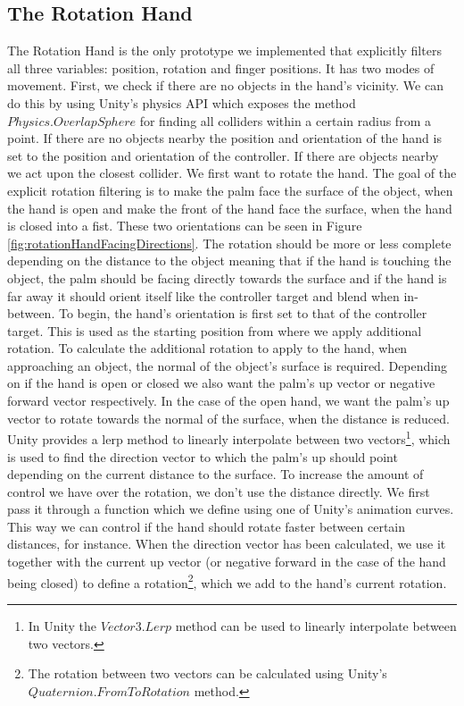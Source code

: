 \subsection{The Rotation Hand}
\label{subsec:rotationHand}
The Rotation Hand is the only prototype we implemented that explicitly filters all three variables: position, rotation and finger positions. It has two modes of movement. First, we check if there are no objects in the hand's vicinity. We can do this by using Unity's physics API which exposes the method $Physics.OverlapSphere$ for finding all colliders within a certain radius from a point. If there are no objects nearby the position and orientation of the hand is set to the position and orientation of the controller. If there are objects nearby we act upon the closest collider. We first want to rotate the hand. The goal of the explicit rotation filtering is to make the palm face the surface of the object, when the hand is open and make the front of the hand face the surface, when the hand is closed into a fist. These two orientations can be seen in Figure \ref{fig:rotationHandFacingDirections}. The rotation should be more or less complete depending on the distance to the object meaning that if the hand is touching the object, the palm should be facing directly towards the surface and if the hand is far away it should orient itself like the controller target and blend when in-between. To begin, the hand's orientation is first set to that of the controller target. This is used as the starting position from where we apply additional rotation. To calculate the additional rotation to apply to the hand, when approaching an object, the normal of the object's surface is required. Depending on if the hand is open or closed we also want the palm's up vector or negative forward vector respectively. In the case of the open hand, we want the palm's up vector to rotate towards the normal of the surface, when the distance is reduced. Unity provides a lerp method to linearly interpolate between two vectors\footnote{In Unity the $Vector3.Lerp$ method can be used to linearly interpolate between two vectors.}, which is used to find the direction vector to which the palm's up should point depending on the current distance to the surface. To increase the amount of control we have over the rotation, we don't use the distance directly. We first pass it through a function which we define using one of Unity's animation curves. This way we can control if the hand should rotate faster between certain distances, for instance. When the direction vector has been calculated, we use it together with the current up vector (or negative forward in the case of the hand being closed) to define a rotation\footnote{The rotation between two vectors can be calculated using Unity's $Quaternion.FromToRotation$ method.}, which we add to the hand's current rotation.

